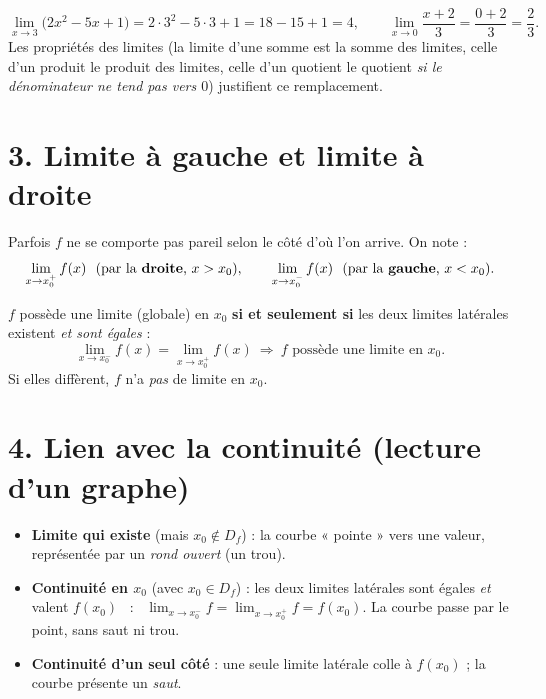 \documentclass[11pt,a4paper]{article}
\begin{document}
\begin{exemple}
\[ \lim_{x\to 3}\bigl(2x^2-5x+1\bigr)=2\cdot 3^2-5\cdot 3+1=18-15+1=4, \qquad
   \lim_{x\to 0}\frac{x+2}{3}=\frac{0+2}{3}=\frac{2}{3}. \]
Les propriétés des limites (la limite d'une somme est la somme des limites, celle d'un produit le
produit des limites, celle d'un quotient le quotient \emph{si le dénominateur ne tend pas vers $0$})
justifient ce remplacement.
\end{exemple}

\section{3. Limite à gauche et limite à droite}

Parfois $f$ ne se comporte pas pareil selon le côté d'où l'on arrive. On note :
\[ \lim_{x\to x_0^{+}} f(x)\ \ (\text{par la \textbf{droite}, }x>x_0),\qquad
   \lim_{x\to x_0^{-}} f(x)\ \ (\text{par la \textbf{gauche}, }x<x_0). \]

\begin{idee}
$f$ possède une limite (globale) en $x_0$ \textbf{si et seulement si} les deux limites latérales
existent \emph{et sont égales} :
\[ \lim_{x\to x_0^{-}} f(x)=\lim_{x\to x_0^{+}} f(x)\ \Longrightarrow\ f\text{ possède une limite en }x_0. \]
Si elles diffèrent, $f$ n'a \emph{pas} de limite en $x_0$.
\end{idee}

\section{4. Lien avec la continuité (lecture d'un graphe)}

\begin{idee}
\begin{itemize}[leftmargin=1.6em,topsep=2pt,itemsep=2pt]
  \item \textbf{Limite qui existe} (mais $x_0\notin D_f$) : la courbe « pointe » vers une valeur,
        représentée par un \emph{rond ouvert} (un trou).
  \item \textbf{Continuité en $x_0$} (avec $x_0\in D_f$) : les deux limites latérales sont égales
        \emph{et} valent $f(x_0)$ ~:~ $\displaystyle\lim_{x\to x_0^{-}}f=\lim_{x\to x_0^{+}}f=f(x_0)$. La courbe passe par le point, sans saut ni trou.
  \item \textbf{Continuité d'un seul côté} : une seule limite latérale colle à $f(x_0)$ ; la courbe
        présente un \emph{saut}.
\end{itemize}
\end{idee}
\end{document}
